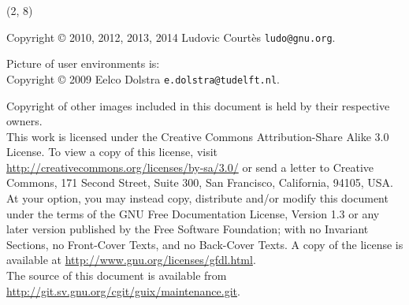\documentclass{beamer}
\begin{document}
\begin{frame}{}

  \begin{textblock}{12}(2, 8)
    \tiny{
      Copyright \copyright{} 2010, 2012, 2013, 2014 Ludovic Courtès \texttt{ludo@gnu.org}.

      Picture of user environments is: \\
      Copyright \copyright{} 2009 Eelco Dolstra \texttt{e.dolstra@tudelft.nl}.

      Copyright of other images included in this document is held by
      their respective owners.
      \\[3.0mm]
      This work is licensed under the \alert{Creative Commons
        Attribution-Share Alike 3.0} License.  To view a copy of this
      license, visit
      \url{http://creativecommons.org/licenses/by-sa/3.0/} or send a
      letter to Creative Commons, 171 Second Street, Suite 300, San
      Francisco, California, 94105, USA.
      \\[2.0mm]
      At your option, you may instead copy, distribute and/or modify
      this document under the terms of the \alert{GNU Free Documentation
        License, Version 1.3 or any later version} published by the Free
      Software Foundation; with no Invariant Sections, no Front-Cover
      Texts, and no Back-Cover Texts.  A copy of the license is
      available at \url{http://www.gnu.org/licenses/gfdl.html}.
      \\[2.0mm]
      The source of this document is available from
      \url{http://git.sv.gnu.org/cgit/guix/maintenance.git}.
    }
  \end{textblock}
\end{frame}
\end{document}
